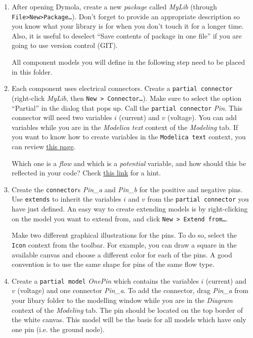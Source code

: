 \documentclass[10pt,a4paper]{article}
\begin{document}
\begin{enumerate}
	\item After opening Dymola, create a new \textit{package} called 
	\textit{MyLib} (through \texttt{File>New>Package\ldots}). Don't forget to 
	provide an appropriate description so you know what your library is for 
	when you don't touch it for a longer time. Also, it is useful to deselect 
	``Save contents of package in one file'' if you are going to use version 
	control (GIT).
	
	All component models you will define in the following step need to be 
	placed in this folder.
	
	\item Each component uses electrical connectors. Create a \texttt{partial 
	connector} (right-click \textit{MyLib}, then \texttt{New > 
	Connector\ldots}). Make sure to select the option ``Partial'' in the dialog 
	that pops up.
	Call the \texttt{partial connector} \textit{Pin}. This connector will need 
	two variables $i$ (current) and $v$ 
	(voltage). You can add variables while you are in the \textit{Modelica 
	text} context of the \textit{Modeling} tab. If you want to know how to 
	create variables in the \texttt{Modelica text} context, you can review 
	\href{http://book.xogeny.com/behavior/equations/variables/#variables}{this 
	page}. 

	Which one is a \textit{flow} and which is a \textit{potential} variable, 
	and how should this be reflected in your code? Check 
	\href{http://book.xogeny.com/components/connectors/simple_domains/#simple-domains}{this
	 link} for a hint.
	
	\item Create the \texttt{connector}s \textit{Pin\_a} and \textit{Pin\_b} 
	for the positive and negative pins.  Use \texttt{extends} to inherit the 
	variables $i$ and $v$ from the \texttt{partial connector} you have just 
	defined. 
	An easy way to create extending models is by right-clicking on the model 
	you want to extend from, and click \texttt{New > Extend from\ldots}.
	
	Make two different graphical illustrations for the pins. To do so, select 
	the \texttt{Icon} context from the toolbar. For example, you can draw a 
	square in the available canvas and choose a different color for each of the 
	pins. A good convention is to use the same shape for pins of the same flow 
	type. 
	
	\item Create a \texttt{partial model} \textit{OnePin} which contains the 
	variables $i$ (current) and $v$ (voltage) and one connector 
	\textit{Pin\_a}. To add the connector, drag \textit{Pin\_a} from your 
	libary folder to the modelling window while you are in the \textit{Diagram} 
	context of the \textit{Modeling} tab. The pin should be located on the top 
	border of the white canvas. This model will be the basis for all models 
	which have only one pin (i.e. the ground node).
	

\end{enumerate}
\end{document}
